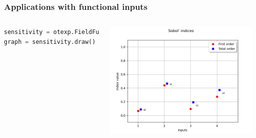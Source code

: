 \documentclass[aspectratio=169]{beamer}
\begin{document}
\begin{frame}[containsverbatim]
\frametitle{Applications with functional inputs}


  \begin{columns}

\begin{lstlisting}[language=Python, numbers = none]
sensitivity = otexp.FieldFunctionalChaosSobolIndices(result)
graph = sensitivity.draw()
\end{lstlisting}


\centering
    \includegraphics[width=.9\textwidth]{figures/FieldSobol.png}
  \end{columns}

\end{frame}

\end{document}
